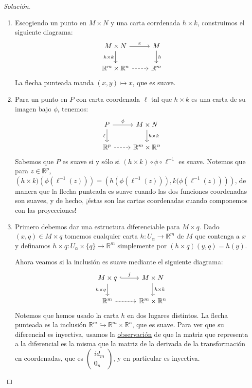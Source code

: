 \documentclass[spanish]{book}
\theoremstyle{definition}
\newcommand{\R}{\mathbb{R}}
\begin{document}
\begin{proof}[Solución]\leavevmode
	\begin{enumerate}
		\item Escogiendo un punto en $M\times N$ y una carta corrdenada $h\times k$, construimos el siguiente diagrama:
		\[\begin{tikzcd}
			M\times N\arrow{r}{\pi}\arrow[swap]{d}{h\times k}&M\arrow{d}{h}\\
			\R^m\times\R^n\arrow[dashed]{r}&\R^m
		\end{tikzcd}\]
		La flecha punteada manda $(x,y)\mapsto x$, que es suave.
		\item Para un punto en $P$ con carta coordenada $\ell$ tal que $h\times k$ es una carta de su imagen bajo $\phi$, tenemos:
		\[\begin{tikzcd}
			P\arrow{r}{\phi}\arrow[swap]{d}{\ell}&M\times N\arrow{d}{h\times k}\\
			\R^p\arrow[dashed]{r}&\R^m\times\R^n
		\end{tikzcd}\]
		Sabemos que $P$ es suave si y sólo si $(h\times k)\circ\phi\circ\ell^{-1}$ es suave.  Notemos que para $z\in\R^p$, $\left(h\times k)\left(\phi\left(\ell^{-1}(z)\right)\right)=\left(h\left(\phi\left(\ell^{-1}(z)\right)\right),k(\phi\left(\ell^{-1}(z)\right)\right)\right)$, de manera que la flecha punteada es suave cuando las dos funciones coordenadas son suaves, y de hecho, ¡éstas son las cartas coordenadas cuando componemos con las proyecciones!
		\item Primero debemos dar una estructura diferenciable para $M\times q$. Dado $(x,q)\in M\times q$ tomemos cualquier carta  $h:U_\alpha\to\R^m$ de $M$ que contenga a $x$ y definamos ${h\times q:U_\alpha\times\{q\}\to\R^m}$ simplemente por $(h\times q)(y,q)=h(y)$.
		
		Ahora veamos si la inclusión es suave mediante el siguiente diagrama:
		\[\begin{tikzcd}
			M\times q\arrow[hook]{r}{j}\arrow[swap]{d}{h\times q}&M\times N\arrow{d}{h\times k}\\
			\R^m\arrow[dashed]{r}&\R^m\times\R^n
		\end{tikzcd}\]
		Notemos que hemos usado la carta $h$ en dos lugares distintos. La flecha punteada es la inclusión $\R^m\hookrightarrow\R^m\times\R^n$, que es suave. Para ver que su diferencial es inyectiva, usamos la \hyperref[obs:dif-mat]{observación} de que la matriz que representa a la diferencial es la misma que la matriz de la derivada de la transformación en coordenadas, que es $\begin{pmatrix}
			id_{m}\\0_{n}
		\end{pmatrix}$, y en particular es inyectiva.
		

\end{enumerate}
\end{proof}
\end{document}
